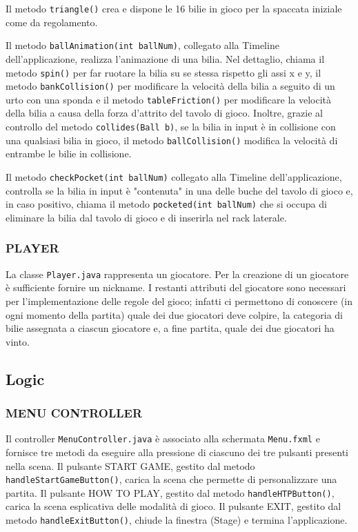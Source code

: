 \documentclass[12pt,a4paper]{report}
\begin{document}
Il metodo \texttt{triangle()} crea e dispone le 16 bilie in gioco per la spaccata iniziale come da regolamento.

\vspace{3mm}

Il metodo \texttt{ballAnimation(int ballNum)}, collegato alla Timeline dell'applicazione, realizza l'animazione di una bilia.
Nel dettaglio, chiama il metodo \texttt{spin()} per far ruotare la bilia su se stessa rispetto gli assi x e y, il metodo \texttt{bankCollision()} per modificare la velocità della bilia a seguito di un urto con una sponda e il metodo \texttt{tableFriction()} per modificare la velocità della bilia a causa della forza d'attrito del tavolo di gioco.
Inoltre, grazie al controllo del metodo \texttt{collides(Ball b)}, se la bilia in input è in collisione con una qualsiasi bilia in gioco, il metodo \texttt{ballCollision()} modifica la velocità di entrambe le bilie in collisione.

\vspace{3mm}

Il metodo \texttt{checkPocket(int ballNum)} collegato alla Timeline dell'applicazione, controlla se la bilia in input è "contenuta" in una delle buche del tavolo di gioco e, in caso positivo, chiama il metodo \texttt{pocketed(int ballNum)} che si occupa di eliminare la bilia dal tavolo di gioco e di inserirla nel rack laterale.

\subsubsection*{PLAYER}
La classe \texttt{Player.java} rappresenta un giocatore.
Per la creazione di un giocatore è sufficiente fornire un nickname.
I restanti attributi del giocatore sono necessari per l'implementazione delle regole del gioco; infatti ci permettono di conoscere (in ogni momento della partita) quale dei due giocatori deve colpire, la categoria di bilie assegnata a ciascun giocatore e, a fine partita, quale dei due giocatori ha vinto.

\subsection{Logic}\label{se:Logic} %

\subsubsection*{MENU CONTROLLER}
Il controller \texttt{MenuController.java} è associato alla schermata \texttt{Menu.fxml} e fornisce tre metodi da eseguire alla pressione di ciascuno dei tre pulsanti presenti nella scena.
Il pulsante START GAME, gestito dal metodo \texttt{handleStartGameButton()}, carica la scena che permette di personalizzare una partita.
Il pulsante HOW TO PLAY, gestito dal metodo \texttt{handleHTPButton()}, carica la scena esplicativa delle modalità di gioco.
Il pulsante EXIT, gestito dal metodo \texttt{handleExitButton()}, chiude la finestra (Stage) e termina l'applicazione.
\end{document}
